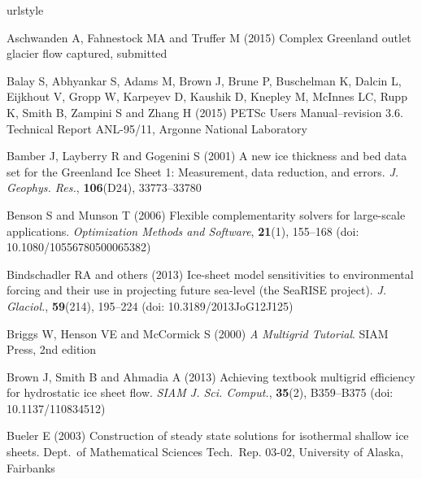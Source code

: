 \documentclass[twocolumn,letterpaper]{igs}
\begin{document}
\begin{thebibliography}{42}
\providecommand{\natexlab}[1]{#1}
\expandafter\ifx\csname urlstyle\endcsname\relax
  \providecommand{\doi}[1]{doi: \discretionary{}{}{}#1}\else
  \providecommand{\doi}{doi: \discretionary{}{}{}\begingroup
  \urlstyle{rm}\Url}\fi

Aschwanden A, Fahnestock MA and Truffer M (2015) Complex {G}reenland outlet
  glacier flow captured, submitted

Balay S, Abhyankar S, Adams M, Brown J, Brune P, Buschelman K, Dalcin L,
  Eijkhout V, Gropp W, Karpeyev D, Kaushik D, Knepley M, McInnes LC, Rupp K,
  Smith B, Zampini S and Zhang H (2015) {PETS}c {U}sers {M}anual--revision 3.6.
  Technical Report ANL-95/11, Argonne National Laboratory

Bamber J, Layberry R and Gogenini S (2001) A new ice thickness and bed data set
  for the {Greenland Ice Sheet} 1: {M}easurement, data reduction, and errors.
  \emph{J. Geophys. Res.}, \textbf{106}(D24), 33773--33780

Benson S and Munson T (2006) Flexible complementarity solvers for large-scale
  applications. \emph{Optimization Methods and Software}, \textbf{21}(1),
  155--168 (\doi {10.1080/10556780500065382})

Bindschadler RA and others (2013) Ice-sheet model sensitivities to
  environmental forcing and their use in projecting future sea-level (the
  {S}ea{RISE} project). \emph{J. Glaciol.}, \textbf{59}(214), 195--224 (\doi
  {10.3189/2013JoG12J125})

Briggs W, Henson VE and McCormick S (2000) \emph{A {M}ultigrid {T}utorial}.
  SIAM Press, 2nd edition

Brown J, Smith B and Ahmadia A (2013) Achieving textbook multigrid efficiency
  for hydrostatic ice sheet flow. \emph{SIAM J. Sci. Comput.}, \textbf{35}(2),
  B359--B375 (\doi {10.1137/110834512})

Bueler E (2003) Construction of steady state solutions for isothermal shallow
  ice sheets. Dept.~of Mathematical Sciences Tech.~Rep. 03-02, University of
  Alaska, Fairbanks


\end{thebibliography}
\end{document}
